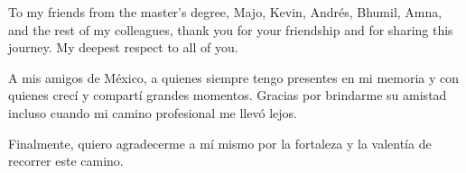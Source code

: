 To my friends from the master’s degree, Majo, Kevin, Andrés, Bhumil, Amna, and the rest of my colleagues, thank you for your friendship and for sharing this journey. My deepest respect to all of you.

A mis amigos de México, a quienes siempre tengo presentes en mi memoria y con quienes crecí y compartí grandes momentos. Gracias por brindarme su amistad incluso cuando mi camino profesional me llevó lejos.

Finalmente, quiero agradecerme a mí mismo por la fortaleza y la valentía de recorrer este camino.